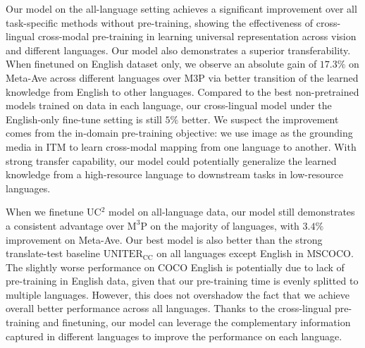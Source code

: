 \documentclass[final]{cvpr}
\newcommand{\luowei}[1]{\textcolor{cyan}{\small{\bf [Luowei: #1 ]}}}
\newcommand{\mingyang}[1]{\textcolor{brown}{\small{\bf [Mingyang: #1 ]}}}
\newcommand{\linjie}[1]{\textcolor{asparagus}{\small{\bf [Linjie: #1 ]}}}
\begin{document}

%

Our model on the all-language setting achieves a significant improvement over all task-specific methods without pre-training, showing the effectiveness of cross-lingual cross-modal  pre-training in learning universal representation across vision and different languages. Our model also demonstrates a superior transferability. When finetuned on English dataset only, we observe an absolute gain of $17.3\%$ on  Meta-Ave
across different languages over M3P via better transition of the learned knowledge from English to other languages.
Compared to the best non-pretrained models trained on data in each language, our cross-lingual model under the English-only fine-tune setting is still $5\%$ better. We suspect the improvement comes from the in-domain pre-training objective: we use image as the grounding media in ITM to learn cross-modal mapping from one language to another. With strong transfer capability, our model could potentially generalize the learned knowledge from a high-resource language to downstream tasks in low-resource languages. %

When we finetune UC${^2}$ model on all-language data, our model still demonstrates a consistent advantage over $\text{M}^3\text{P}$ on the majority of languages, with $3.4\%$ improvement on Meta-Ave. Our best model is also better than the strong translate-test baseline $\text{UNITER}_{\text{CC}}$ on all languages except English in MSCOCO. The slightly worse performance on COCO English is potentially due to lack of pre-training in English data, given that our pre-training time is evenly splitted to multiple languages. However, this does not overshadow the fact that we achieve overall better performance across all languages.  Thanks to the cross-lingual pre-training and finetuning, our model can leverage the complementary information captured in different languages to improve the performance on each language. 
\end{document}
